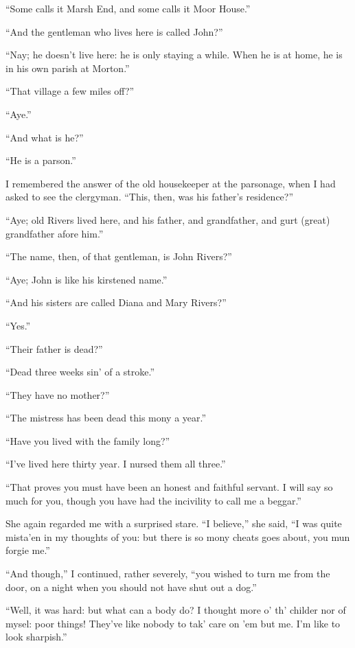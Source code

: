 \enquote{Some calls it Marsh End, and some calls it Moor House.}

\enquote{And the gentleman who lives here is called \Mr{} \St{} John?}

\enquote{Nay; he doesn't live here: he is only staying a while. When he
is at home, he is in his own parish at Morton.}

\enquote{That village a few miles off?} %

\enquote{Aye.}

\enquote{And what is he?}

\enquote{He is a parson.}

I remembered the answer of the old housekeeper at the parsonage, when I
had asked to see the clergyman. \enquote{This, then, was his father's
residence?}

\enquote{Aye; old \Mr{} Rivers lived here, and his father, and
grandfather, and gurt (great) grandfather afore him.}

\enquote{The name, then, of that gentleman, is \Mr{} \St{} John Rivers?}

\enquote{Aye; \St{} John is like his kirstened name.}

\enquote{And his sisters are called Diana and Mary Rivers?}

\enquote{Yes.}

\enquote{Their father is dead?}

\enquote{Dead three weeks sin' of a stroke.}

\enquote{They have no mother?}

\enquote{The mistress has been dead this mony a year.}

\enquote{Have you lived with the family long?}

\enquote{I've lived here thirty year. I nursed them all three.}

\enquote{That proves you must have been an honest and faithful servant. 
I will say so much for you, though you have had the incivility to call
me a beggar.}

She again regarded me with a surprised stare. \enquote{I believe,} she
said, \enquote{I was quite mista'en in my thoughts of you: but there is
so mony cheats goes about, you mun forgie me.}

\enquote{And though,} I continued, rather severely, \enquote{you wished
to turn me from the door, on a night when you should not have shut out a
dog.}

\enquote{Well, it was hard: but what can a body do? I thought more o'
th' childer nor of mysel: poor things! They've like nobody to tak' care
on 'em but me. I'm like to look sharpish.}


